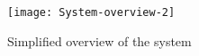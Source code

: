 \begin{figure}[h]
\centering
\texttt{[image: System-overview-2]}
\caption{Simplified overview of the system}
\label{fig:overview}
\end{figure}